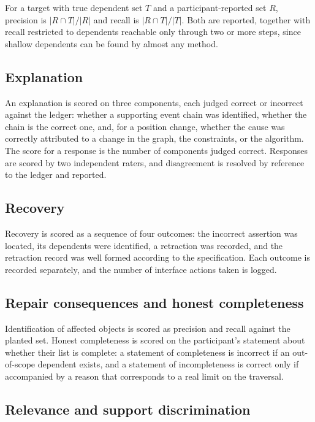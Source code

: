 \documentclass[11pt]{article}
\theoremstyle{definition}
\begin{document}
For a target with true dependent set $T$ and a participant-reported set $R$, precision is $|R \cap T| / |R|$ and recall is $|R \cap T| / |T|$. Both are reported, together with recall restricted to dependents reachable only through two or more steps, since shallow dependents can be found by almost any method.

\subsection{Explanation}

An explanation is scored on three components, each judged correct or incorrect against the ledger: whether a supporting event chain was identified, whether the chain is the correct one, and, for a position change, whether the cause was correctly attributed to a change in the graph, the constraints, or the algorithm. The score for a response is the number of components judged correct. Responses are scored by two independent raters, and disagreement is resolved by reference to the ledger and reported.

\subsection{Recovery}

Recovery is scored as a sequence of four outcomes: the incorrect assertion was located, its dependents were identified, a retraction was recorded, and the retraction record was well formed according to the specification. Each outcome is recorded separately, and the number of interface actions taken is logged.

\subsection{Repair consequences and honest completeness}

Identification of affected objects is scored as precision and recall against the planted set. Honest completeness is scored on the participant's statement about whether their list is complete: a statement of completeness is incorrect if an out-of-scope dependent exists, and a statement of incompleteness is correct only if accompanied by a reason that corresponds to a real limit on the traversal.

\subsection{Relevance and support discrimination}
\end{document}
